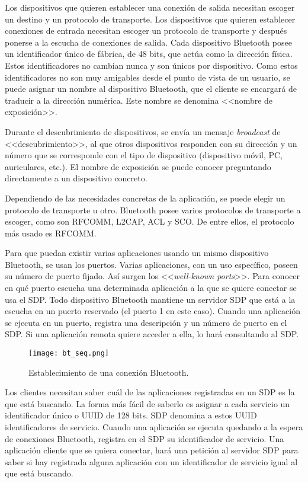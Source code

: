Los dispositivos que quieren establecer una conexión de salida necesitan escoger un destino y un protocolo de transporte. Los dispositivos que quieren establecer conexiones de entrada necesitan escoger un protocolo de transporte y después ponerse a la escucha de conexiones de salida. Cada dispositivo Bluetooth posee un identificador único de fábrica, de 48 bits, que actúa como la dirección física. Estos identificadores no cambian nunca y son únicos por dispositivo. Como estos identificadores no son muy amigables desde el punto de vista de un usuario, se puede asignar un nombre al dispositivo Bluetooth, que el cliente se encargará de traducir a la dirección numérica. Este nombre se denomina <<nombre de exposición>>. 

Durante el descubrimiento de dispositivos, se envía un mensaje \textit{broadcast} de <<descubrimiento>>, al que otros dispositivos responden con su dirección y un número que se corresponde con el tipo de dispositivo (dispositivo móvil, PC, auriculares, etc.). El nombre de exposición se puede conocer preguntando directamente a un dispositivo concreto.

Dependiendo de las necesidades concretas de la aplicación, se puede elegir un protocolo de transporte u otro. Bluetooth posee varios protocolos de transporte a escoger, como son \ac{RFCOMM}, \ac{L2CAP}, \ac{ACL} y \ac{SCO}. De entre ellos, el protocolo más usado es \ac{RFCOMM}.

Para que puedan existir varias aplicaciones usando un mismo dispositivo Bluetooth, se usan los puertos. Varias aplicaciones, con un uso específico, poseen su número de puerto fijado. Así surgen los <<\textit{well-known ports}>>. Para conocer en qué puerto escucha una determinada aplicación a la que se quiere conectar se usa el \ac{SDP}. Todo dispositivo Bluetooth mantiene un servidor \ac{SDP} que está a la escucha en un puerto reservado (el puerto 1 en este caso). Cuando una aplicación se ejecuta en un puerto, registra una descripción y un número de puerto en el \ac{SDP}. Si una aplicación remota quiere acceder a ella, lo hará consultando al \ac{SDP}.

\begin{figure}[!h]
\begin{center}
\texttt{[image: bt\_seq.png]}
\caption{Establecimiento de una conexión Bluetooth.}
\label{fig:seq_bt}
\end{center}
\end{figure}

Los clientes necesitan saber cuál de las aplicaciones registradas en un \ac{SDP} es la que está buscando. La forma más fácil de saberlo es asignar a cada servicio un identificador único o \ac{UUID} de 128 bits. \ac{SDP} denomina a estos \ac{UUID} identificadores de servicio. Cuando una aplicación se ejecuta quedando a la espera de conexiones Bluetooth, registra en el \ac{SDP} su identificador de servicio. Una aplicación cliente que se quiera conectar, hará una petición al servidor \ac{SDP} para saber si hay registrada alguna aplicación con un identificador de servicio igual al que está buscando.

